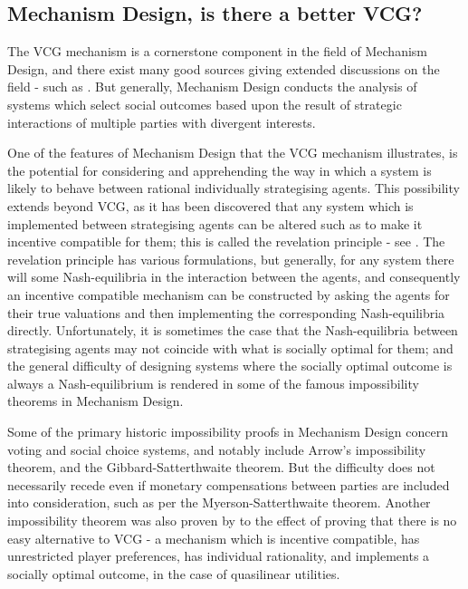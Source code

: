 \subsection{Mechanism Design, is there a better VCG?}

The VCG mechanism is a cornerstone component in the field of Mechanism Design, and there exist many good sources giving extended discussions on the field - such as \cite{37377}.
But generally, Mechanism Design conducts the analysis of systems which select social outcomes based upon the result of strategic interactions of multiple parties with divergent interests.%

One of the features of Mechanism Design that the VCG mechanism illustrates, is the potential for considering and apprehending the way in which a system is likely to behave between rational individually strategising agents.
This possibility extends beyond VCG, as it has been discovered that any system which is implemented between strategising agents can be altered such as to make it incentive compatible for them; this is called the revelation principle - see \cite{RePEc:ecm:emetrp:v:41:y:1973:i:4:p:587-601} \cite[Chapter~2.3]{37377}.
The revelation principle has various formulations, but generally, for any system there will some Nash-equilibria in the interaction between the agents, and consequently an incentive compatible mechanism can be constructed by asking the agents for their true valuations and then implementing the corresponding Nash-equilibria directly.
Unfortunately, it is sometimes the case that the Nash-equilibria between strategising agents may not coincide with what is socially optimal for them; and the general difficulty of designing systems where the socially optimal outcome is always a Nash-equilibrium is rendered in some of the famous impossibility theorems in Mechanism Design. %

Some of the primary historic impossibility proofs in Mechanism Design concern voting and social choice systems, and notably include Arrow's impossibility theorem, and the Gibbard-Satterthwaite theorem.
But the difficulty does not necessarily recede even if monetary compensations between parties are included into consideration, such as per the Myerson-Satterthwaite theorem.
Another impossibility theorem was also proven by \cite{29088} to the effect of proving that there is no easy alternative to VCG - a mechanism which is incentive compatible, has unrestricted player preferences, has individual rationality, and implements a socially optimal outcome, in the case of quasilinear utilities.


